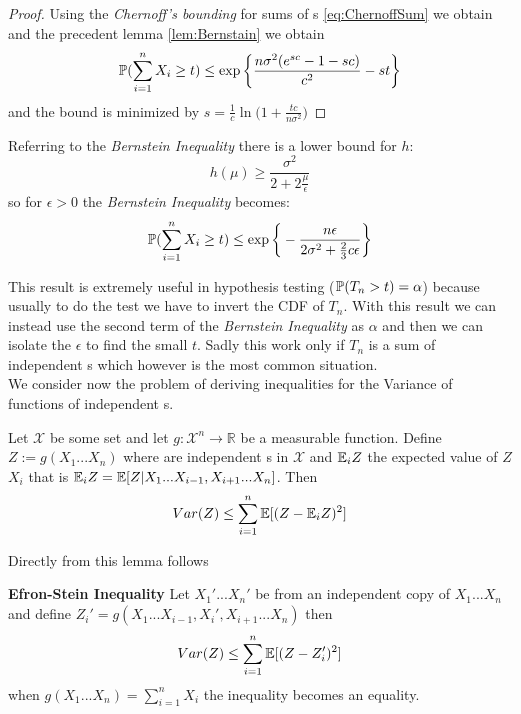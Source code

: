 \begin{proof}
		Using the \textit{Chernoff's bounding} for sums of \rv s  \ref{eq:ChernoffSum} we obtain and the precedent lemma \ref{lem:Bernstain} we obtain 
			$$\mathbb{P}(\sum_{i=1}^{n}X_i \geq t)\leq \exp \bigg\{\frac{n\sigma^2(e^{sc}-1-sc)}{c^2}-st\bigg\}$$
			and the bound is minimized by $s=\frac{1}{c}\ln\bigg(1+\frac{tc}{n\sigma^2} \bigg)$
\end{proof}

\begin{corol}
	Referring to the \textit{Bernstein Inequality} there is a lower bound for $h$:
	$$h(\mu)\geq \frac{\sigma^2}{2+2\frac{\mu}{\epsilon}}$$
	so for $\epsilon >0$ the \textit{Bernstein Inequality} becomes:
	$$\mathbb{P}(\sum_{i=1}^{n}X_i\geq t)\leq \exp\bigg\{-\frac{n\epsilon}{2\sigma^2+\frac{2}{3}c\epsilon}\bigg\}$$
\end{corol}
This result is extremely useful in hypothesis testing ($\mathbb{P}(T_n>t)=\alpha$) because usually to do the test we have to invert the CDF of $T_n$. With this result we can instead use the second term of the \textit{Bernstein Inequality} as $\alpha$ and then we can isolate the $\epsilon$ to find the small $t$. Sadly this work only if $T_n$ is a sum of independent \rv s which however is the most common situation.\\

We consider now the problem of deriving inequalities for the Variance of functions of independent \rv s.

\begin{lem}
	Let $\mathcal{X}$ be some set and let $g:\mathcal{X}^n\to \mathbb{R}$ be a measurable function. Define $Z:=g(X_1...X_n)$ where \xii are independent \rv s in $\mathcal{X}$ and $\mathbb{E}_iZ$ the expected value of $Z$ \wrt $X_i$ that is $\mathbb{E}_iZ=\mathbb{E}[Z|X_1...X_{i-1},X_{i+1}...X_n]$. Then
	$$Var(Z)\leq \sum_{i=1}^{n}\mathbb{E}[(Z-\mathbb{E}_iZ)^2]$$
\end{lem}

Directly from this lemma follows
\begin{teo}\textbf{Efron-Stein Inequality}
	Let $X_1'...X_n'$ be from an independent copy of $X_1...X_n$ and define $Z_i'=g(X_1...X_{i-1},X_{i}',X_{i+1}...X_n)$ then
	$$Var(Z)\leq \sum_{i=1}^{n}\mathbb{E}[(Z-Z_i')^2]$$
	when $g(X_1...X_n)=\sum_{i=1}^{n}X_i$ the inequality becomes an equality.
\end{teo}
